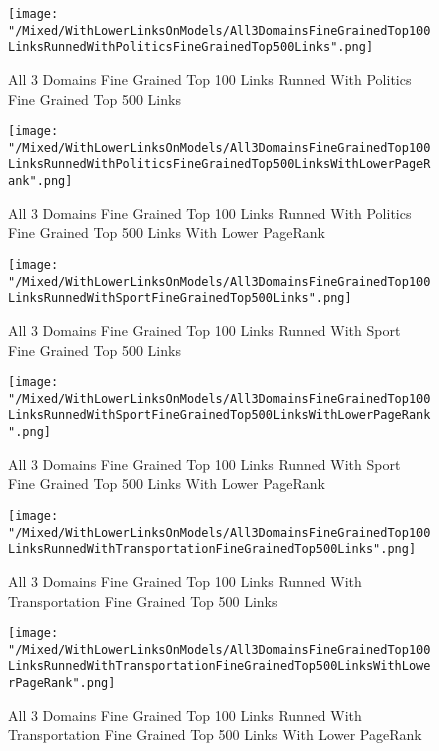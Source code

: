 \documentclass[thesis=M,english]{FITthesis}[2012/10/20]
\begin{document}
	\begin{figure}\centering
		\texttt{[image: "/Mixed/WithLowerLinksOnModels/All3DomainsFineGrainedTop100LinksRunnedWithPoliticsFineGrainedTop500Links".png]}
		\caption{All 3 Domains Fine Grained Top 100 Links Runned With Politics Fine Grained Top 500 Links}\label{}
	\end{figure}
	
	\begin{figure}\centering
		\texttt{[image: "/Mixed/WithLowerLinksOnModels/All3DomainsFineGrainedTop100LinksRunnedWithPoliticsFineGrainedTop500LinksWithLowerPageRank".png]}
		\caption{All 3 Domains Fine Grained Top 100 Links Runned With Politics Fine Grained Top 500 Links With Lower PageRank}\label{}
	\end{figure}
	
	\begin{figure}\centering
		\texttt{[image: "/Mixed/WithLowerLinksOnModels/All3DomainsFineGrainedTop100LinksRunnedWithSportFineGrainedTop500Links".png]}
		\caption{All 3 Domains Fine Grained Top 100 Links Runned With Sport Fine Grained Top 500 Links}\label{}
	\end{figure}
	
	\begin{figure}\centering
		\texttt{[image: "/Mixed/WithLowerLinksOnModels/All3DomainsFineGrainedTop100LinksRunnedWithSportFineGrainedTop500LinksWithLowerPageRank".png]}
		\caption{All 3 Domains Fine Grained Top 100 Links Runned With Sport Fine Grained Top 500 Links With Lower PageRank}\label{}
	\end{figure}
	
	\begin{figure}\centering
		\texttt{[image: "/Mixed/WithLowerLinksOnModels/All3DomainsFineGrainedTop100LinksRunnedWithTransportationFineGrainedTop500Links".png]}
		\caption{All 3 Domains Fine Grained Top 100 Links Runned With Transportation Fine Grained Top 500 Links}\label{}
	\end{figure}

	\begin{figure}\centering
		\texttt{[image: "/Mixed/WithLowerLinksOnModels/All3DomainsFineGrainedTop100LinksRunnedWithTransportationFineGrainedTop500LinksWithLowerPageRank".png]}
		\caption{All 3 Domains Fine Grained Top 100 Links Runned With Transportation Fine Grained Top 500 Links With Lower PageRank}\label{}
	\end{figure}
	
\end{document}
